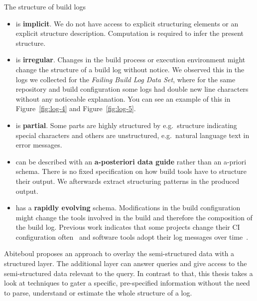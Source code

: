 \documentclass[\myrootdir/main.tex]{subfiles}
\begin{document}
The structure of build logs
\begin{itemize}
  \item is \textbf{implicit}.
  We do not have access to explicit structuring elements or an explicit structure description.
  Computation is required to infer the present structure.
  \item is \textbf{irregular}.
  Changes in the build process or execution environment might change the structure of a build log without notice.
  We observed this in the logs we collected for the \emph{Failing Build Log Data Set}, where for the same repository and build configuration some logs had double new line characters without any noticeable explanation.
  You can see an example of this in Figure~\ref{fig:log-4} and Figure~\ref{fig:log-5}.
  \item is \textbf{partial}. Some parts are highly structured by e.g.\ structure indicating special characters and others are unstructured, e.g.\ natural language text in error messages.
  \item can be described with an \textbf{a-posteriori data guide} rather than an a-priori schema.
  There is no fixed specification on how build tools have to structure their output.
  We afterwards extract structuring patterns in the produced output.
  \item has a \textbf{rapidly evolving} schema.
  Modifications in the build configuration might change the tools involved in the build and therefore the composition of the build log.
  Previous work indicates that some projects change their CI configuration often~\cite{hilton2016usage} and software tools adopt their log messages over time~\cite{yuan2012characterizing}.
\end{itemize}

Abiteboul proposes an approach to overlay the semi-structured data with a structured layer.
The additional layer can answer queries and give access to the semi-structured data relevant to the query.
In contrast to that, this thesis takes a look at techniques to gater a specific, pre-specified information without the need to parse, understand or estimate the whole structure of a log.
\end{document}

